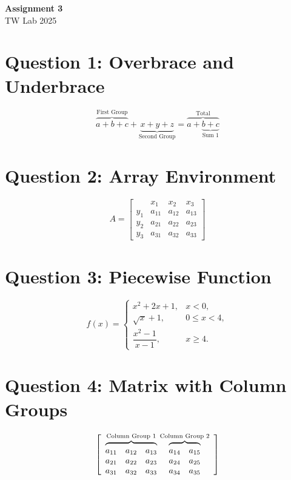 \documentclass[11pt,a4paper]{article}
\begin{document}
\begin{center}
  {\Large\bfseries Assignment 3}\\
  TW Lab 2025
\end{center}

\section*{Question 1: Overbrace and Underbrace}
\[
\overbrace{a+b+c}^{\text{First Group}}
+
\underbrace{x+y+z}_{\text{Second Group}}
=
\overbrace{a+\underbrace{b+c}_{\text{Sum 1}}}^{\text{Total}}
\]

\section*{Question 2: Array Environment}
\[
A=
\left[
\begin{array}{c|ccc}
 & x_1 & x_2 & x_3\\ \hline
y_1 & a_{11} & a_{12} & a_{13}\\
y_2 & a_{21} & a_{22} & a_{23}\\
y_3 & a_{31} & a_{32} & a_{33}
\end{array}
\right]
\]

\section*{Question 3: Piecewise Function}
\[
f(x)=
\begin{cases}
x^2+2x+1, & x<0,\\
\sqrt{x}+1, & 0\le x<4,\\
\dfrac{x^2-1}{x-1}, & x\ge4.
\end{cases}
\]

\section*{Question 4: Matrix with Column Groups}
\[
\left[
\begin{array}{c@{\ }c}
\overbrace{
\begin{matrix}
a_{11}&a_{12}&a_{13}\\
a_{21}&a_{22}&a_{23}\\
a_{31}&a_{32}&a_{33}
\end{matrix}
}^{\text{Column Group 1}}
&
\overbrace{
\begin{matrix}
a_{14}&a_{15}\\
a_{24}&a_{25}\\
a_{34}&a_{35}
\end{matrix}
}^{\text{Column Group 2}}
\end{array}
\right]
\]
\end{document}
